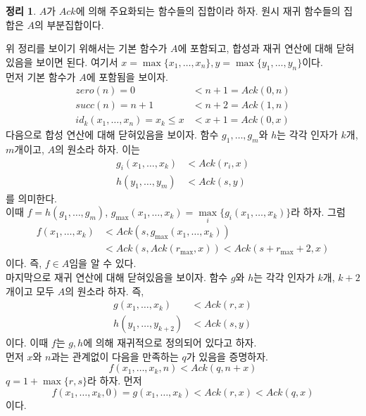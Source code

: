 \documentclass[b5paper, 11pt]{book}
\theoremstyle{definition}
\newtheorem{thm}[defn]{정리}
\newenvironment{pf*}{\pushQED{\qed}\pf}
{\popQED\endpf}
\begin{document}
\begin{thm} \label{forack}
    $A$가 $Ack$에 의해 주요화되는 함수들의 집합이라 하자. 원시 재귀 함수들의 집합은 $A$의 부분집합이다.
\end{thm}
\begin{pf*}
    위 정리를 보이기 위해서는 기본 함수가 $A$에 포함되고, 합성과 재귀 연산에 대해 닫혀있음을 보이면 된다. 여기서 $x = \max \{x_1, \ldots, x_n\}, y = \max\{y_1, \ldots, y_n\}$이다. \\ 
    먼저 기본 함수가 $A$에 포함됨을 보이자.  
    \begin{align*}
        zero(n) = 0 &< n+1 = Ack(0,n) \\ 
        succ(n) = n+1 &<n+2 = Ack(1,n) \\ 
        id_k(x_1, \ldots, x_n) = x_k \le x &< x+1 = Ack(0,x) 
    \end{align*} 
    다음으로 합성 연산에 대해 닫혀있음을 보이자. 함수 $g_1, \ldots, g_m$와 $h$는 각각 인자가 $k$개, $m$개이고, $A$의 원소라 하자. 이는 
    \begin{align*}
        g_i(x_1, \ldots, x_k) &< Ack(r_i, x) \\ 
        h(y_1, \ldots, y_m) &< Ack(s,y)
    \end{align*}
    를 의미한다. \\ 
    이때 $f = h(g_1, \ldots, g_m)$, $ g_{\max} (x_1,\ldots, x_k) =\underset{i}{\max} \{g_i(x_1, \ldots, x_k)\}$라 하자. 
    그럼 
    \begin{align*}
        f(x_1, \ldots, x_k) &< Ack(s, g_{\max}(x_1, \ldots, x_k)) \\ 
        &< Ack(s, Ack(r_{\max},x)) < Ack(s+r_{\max}+2,x)
    \end{align*}
    이다. 
    즉, $f \in A$임을 알 수 있다. \\ 
    마지막으로 재귀 연산에 대해 닫혀있음을 보이자. 함수 $g$와 $h$는 각각 인자가 $k$개, $k+2$개이고 모두 $A$의 원소라 
    하자. 즉, 
    \begin{align*}
        g(x_1, \ldots, x_k) &< Ack(r, x) \\ 
        h(y_1,\ldots, y_{k+2}) &< Ack(s,y)
    \end{align*}
    이다. 이때
    $f$는 $g,h$에 의해 재귀적으로 정의되어 있다고 하자.\\ 
    먼저 $x$와 $n$과는 관계없이 다음을 만족하는 $q$가 있음을 증명하자. 
    $$f(x_1, \ldots, x_k, n) < Ack(q, n+x)$$
    $q= 1 + \max \{r,s\}$라 하자. 
    먼저 
    $$f(x_1, \ldots, x_k, 0) = g(x_1, \ldots, x_k) < Ack(r,x) <Ack(q,x)$$
    이다.\\

\end{pf*}
\end{document}
